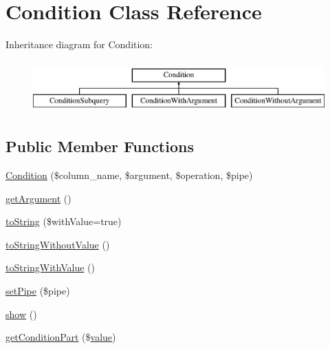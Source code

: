 \hypertarget{classCondition}{}\section{Condition Class Reference}
\label{classCondition}
Inheritance diagram for Condition\+:\begin{figure}[H]
\begin{center}
\leavevmode
\includegraphics[height=2.000000cm]{classCondition}
\end{center}
\end{figure}
\subsection*{Public Member Functions}
\begin{DoxyCompactItemize}
\item 
\hyperlink{classCondition_aaf108d388895d9fe832a52e5586c0ecb}{Condition} (\$column\+\_\+name, \$argument, \$operation, \$pipe)
\item 
\hyperlink{classCondition_a638fb386fab511447a1770d1653936ed}{get\+Argument} ()
\item 
\hyperlink{classCondition_aa4072b1db0e4f4d3a1dae0f1982781e1}{to\+String} (\$with\+Value=true)
\item 
\hyperlink{classCondition_ae472caca5533fe0442eb56fe38cc8ef1}{to\+String\+Without\+Value} ()
\item 
\hyperlink{classCondition_ac15dfd53b971b98fd34b7cfff99ab4c8}{to\+String\+With\+Value} ()
\item 
\hyperlink{classCondition_a5b8810c0b90532ea2bb73561c6d2f986}{set\+Pipe} (\$pipe)
\item 
\hyperlink{classCondition_a72cefb980f256f8c2ae6801e9c8868b9}{show} ()
\item 
\hyperlink{classCondition_a29b59a5ef75db900c012dc5111fb24cf}{get\+Condition\+Part} (\$\hyperlink{jquery_8js_abe5393d870043cf6aaa1d5ad5fce755c}{value})
\end{DoxyCompactItemize}
